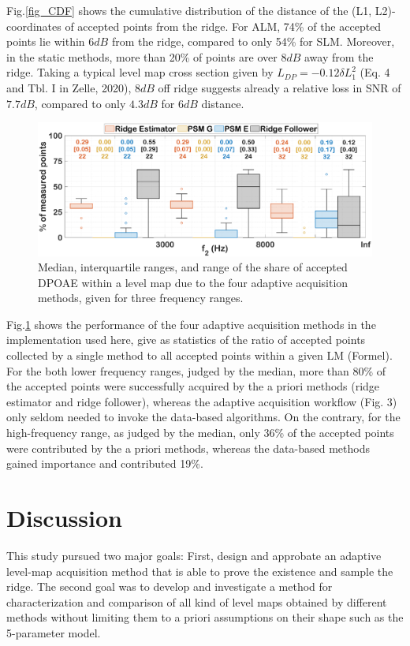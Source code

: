 \documentclass[journal,twoside,web]{ieeecolor2}
\begin{document}
Fig.\ref{fig_CDF} shows the cumulative distribution of the distance of the (L1, L2)-coordinates of accepted points from the ridge. For ALM, 74\% of the accepted points lie within $6 dB$ from the ridge, compared to only 54\% for SLM. Moreover, in the static methods, more than 20\% of points are over $8 dB$ away from the ridge. Taking a typical level map cross section given by $L_{DP} =-0.12 \delta L_1^2$ (Eq. 4 and Tbl. I in Zelle, 2020), $8 dB$ off ridge suggests already a relative loss in SNR of $7.7 dB$, compared to only $4.3 dB$ for $6 dB$ distance.

\begin{figure}[ht]
\centerline{\includegraphics[width=\columnwidth]{Fig_10_Boxplots.eps}}
\caption{Median, interquartile ranges, and range of the share of accepted DPOAE within a level map due to the four adaptive acquisition methods, given for three frequency ranges.}
\label{fig_BXP}
\end{figure}

Fig.\ref{fig_BXP} shows the performance of the four adaptive acquisition methods in the implementation used here, give as statistics of the ratio of accepted points collected by a single method to all accepted points within a given LM (Formel). For the both lower frequency ranges, judged by the median, more than 80\% of the accepted points were successfully acquired by the a priori methods (ridge estimator and ridge follower), whereas the adaptive acquisition workflow (Fig. 3) only seldom needed to invoke the data-based algorithms. On the contrary, for the high-frequency range, as judged by the median, only 36\% of the accepted points were contributed by the a priori methods, whereas the data-based methods gained importance and contributed 19\%.

\section{Discussion}
This study pursued two major goals: First, design and approbate an adaptive level-map acquisition method that is able to prove the existence and sample the ridge. The second goal was to develop and investigate a method for characterization and comparison of all kind of level maps obtained by different methods without limiting them to a priori assumptions on their shape such as the 5-parameter model.
\end{document}
